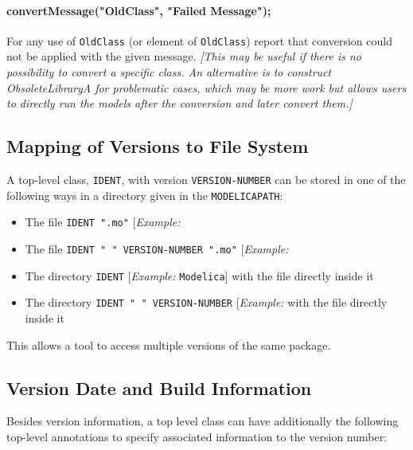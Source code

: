\paragraph*{convertMessage("OldClass", "Failed Message");}

For any use of \lstinline!OldClass! (or element of \lstinline!OldClass!) report that conversion
could not be applied with the given message. \emph{{[}This may be useful
if there is no possibility to convert a specific class. An alternative
is to construct ObsoleteLibraryA for problematic cases, which may be
more work but allows users to directly run the models after the
conversion and later convert them.{]}}

\subsection{Mapping of Versions to File System}

A top-level class, \lstinline!IDENT!, with version \lstinline!VERSION-NUMBER! can be stored in
one of the following ways in a directory given in the \lstinline!MODELICAPATH!:

\begin{itemize}
\item
  The file \lstinline!IDENT ".mo"! {[}\emph{Example:} \filename{Modelica.mo}{]}
\item
  The file \lstinline!IDENT " " VERSION-NUMBER ".mo"! {[}\emph{Example:} \filename{Modelica 2.1.mo}{]}
\item
  The directory \lstinline!IDENT! {[}\emph{Example:} \lstinline!Modelica!{]} with the file
   directly inside it
\item
  The directory \lstinline!IDENT " " VERSION-NUMBER! {[}\emph{Example:}
	\filename{Modelica 2.1}{]} with the file  directly inside it
\end{itemize}

This allows a tool to access multiple versions of the same package.

\subsection{Version Date and Build Information}

Besides version information, a top level class can have additionally the
following top-level annotations to specify associated information to the
version number:

